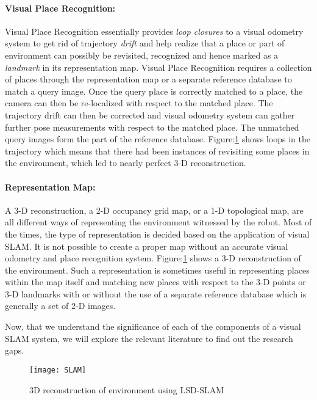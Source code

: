\documentclass{article}
\begin{document}
\paragraph{Visual Place Recognition:}
Visual Place Recognition essentially provides \emph{loop closures} to a visual odometry system to get rid of trajectory \emph{drift} and help realize that a place or part of environment can possibly be revisited, recognized and hence marked as a \emph{landmark} in its representation map. Visual Place Recognition requires a collection of places through the representation map or a separate reference database to match a query image. Once the query place is correctly matched to a place, the camera can then be re-localized with respect to the matched place. The trajectory drift can then be corrected and visual odometry system can gather further pose measurements with respect to the matched place. The unmatched query images form the part of the reference database. Figure:\ref{fig:slamExample} shows loops in the trajectory which means that there had been instances of revisiting some places in the environment, which led to nearly perfect 3-D reconstruction.

\paragraph{Representation Map:}
A 3-D reconstruction, a 2-D occupancy grid map, or a 1-D topological map, are all different ways of representing the environment witnessed by the robot. Most of the times, the type of representation is decided based on the application of visual SLAM. It is not possible to create a proper map without an accurate visual odometry and place recognition system. Figure:\ref{fig:slamExample} shows a 3-D reconstruction of the environment. Such a representation is sometimes useful in representing places within the map itself and matching new places with respect to the 3-D points or 3-D landmarks with or without the use of a separate reference database which is generally a set of 2-D images.

Now, that we understand the significance of each of the components of a visual SLAM system, we will explore the relevant literature to find out the research gaps.


\begin{figure}[htbp]
\centering
 \texttt{[image: SLAM]}
 \caption{3D reconstruction of environment using LSD-SLAM \cite{Engel2014lsd}}
 \label{fig:slamExample}
\end{figure}
\end{document}
